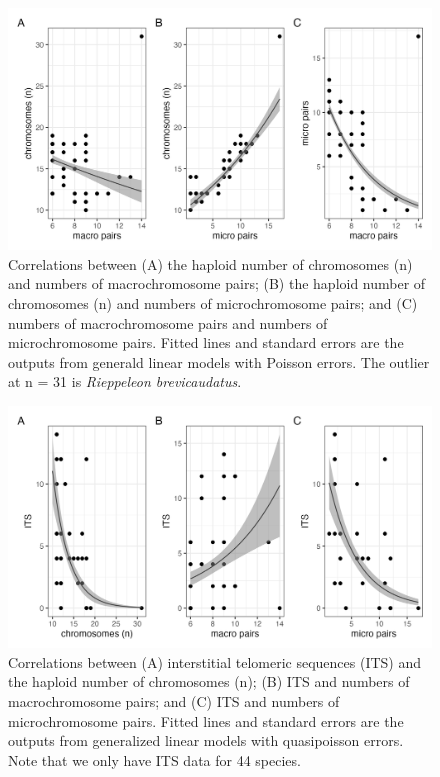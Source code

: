 \documentclass[a4paper, 12pt]{article}
\begin{document}
\newpage
\begin{figure}[h]
 \centering
  \includegraphics[width = \linewidth]{figures/micro-macro-chromosomes.png}
  \caption{Correlations between (A) the haploid number of chromosomes (n) and numbers of macrochromosome pairs; (B) the haploid number of chromosomes (n) and numbers of microchromosome pairs; and (C) numbers of macrochromosome pairs and numbers of microchromosome pairs. Fitted lines and standard errors are the outputs from generald linear models with Poisson errors. The outlier at n = 31 is \textit{Rieppeleon brevicaudatus}.
}
  \label{fig-chroms}
\end{figure}

\newpage
\begin{figure}[h]
 \centering
  \includegraphics[width = \linewidth]{figures/ITS-chromosomes.png}
  \caption{Correlations between (A) interstitial telomeric sequences (ITS) and the haploid number of chromosomes (n); (B) ITS and numbers of macrochromosome pairs; and (C) ITS and numbers of microchromosome pairs. Fitted lines and standard errors are the outputs from generalized linear models with quasipoisson errors. Note that we only have ITS data for 44 species.
}
  \label{fig-its}
\end{figure}
\end{document}
